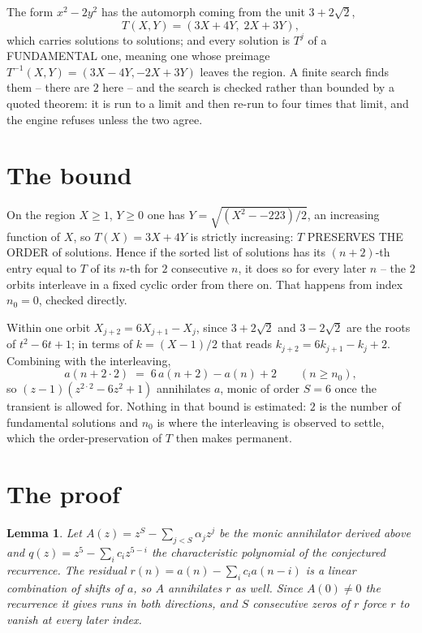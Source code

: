 \documentclass[11pt,a4paper]{article}
\theoremstyle{plain}
\newtheorem{lemma}[theorem]{Lemma}
\theoremstyle{definition}
\begin{document}
The form $x^2-2y^2$ has the automorph coming from the unit $3+2\sqrt2$,
\[
T(X,Y)=(3X+4Y,\;2X+3Y),
\]
which carries solutions to solutions; and every solution is $T^{j}$ of a FUNDAMENTAL one,
meaning one whose preimage $T^{-1}(X,Y)=(3X-4Y,-2X+3Y)$ leaves the region. A finite search
finds them -- there are $2$ here -- and the search is checked rather than bounded by a quoted
theorem: it is run to a limit and then re-run to four times that limit, and the engine refuses
unless the two agree.

\section{The bound}

On the region $X\ge1$, $Y\ge0$ one has $Y=\sqrt{(X^2--223)/2}$, an increasing function of $X$,
so $T(X)=3X+4Y$ is strictly increasing: $T$ PRESERVES THE ORDER of solutions. Hence if the
sorted list of solutions has its $(n+2)$-th entry equal to $T$ of its $n$-th for $2$
consecutive $n$, it does so for every later $n$ -- the $2$ orbits interleave in a fixed cyclic
order from there on. That happens from index $n_0=0$, checked directly.

Within one orbit $X_{j+2}=6X_{j+1}-X_j$, since $3+2\sqrt2$ and $3-2\sqrt2$ are the roots of
$t^2-6t+1$; in terms of $k=(X-1)/2$ that reads $k_{j+2}=6k_{j+1}-k_j+2$. Combining with the
interleaving,
\[
a(n+2\cdot2)\;=\;6\,a(n+2)-a(n)+2 \qquad (n\ge n_0),
\]
so $(z-1)(z^{2\cdot2}-6z^{2}+1)$ annihilates $a$, monic of order $S=6$ once the
transient is allowed for. Nothing in that bound is estimated: $2$ is the number of fundamental
solutions and $n_0$ is where the interleaving is observed to settle, which the order-preservation
of $T$ then makes permanent.

\section{The proof}

\begin{lemma}\label{lem:crit}
Let $A(z)=z^S-\sum_{j<S}\alpha_jz^{j}$ be the monic annihilator derived above and
$q(z)=z^{5}-\sum_ic_iz^{5-i}$ the characteristic polynomial of the conjectured
recurrence. The residual $r(n)=a(n)-\sum_ic_ia(n-i)$ is a linear combination of shifts of $a$,
so $A$ annihilates $r$ as well. Since $A(0)\ne0$ the recurrence it gives runs in both
directions, and $S$ consecutive zeros of $r$ force $r$ to vanish at every later index.
\end{lemma}
\end{document}
